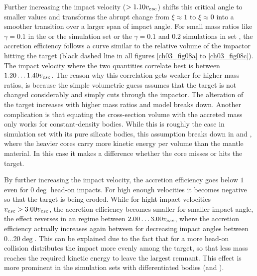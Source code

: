 Further increasing the impact velocity ($> 1.10 v_{esc}$) shifts this critical angle to smaller values and transforms the abrupt change from $\xi \approx 1$ to $\xi \approx 0$ into a smoother transition over a larger span of impact angle. For small mass ratios like $\gamma = 0.1$ in the \css or the simulation set or the $\gamma = 0.1$ and $0.2$ simulations in set \rss, the accretion efficiency follows a curve similar to the relative volume of the impactor hitting the target (black dashed line in all figures \ref{ch03_fig08a} to \ref{ch03_fig08c}). The impact velocity where the two quantities correlate best is between $1.20 \dots 1.40 v_{esc}$. The reason why this correlation gets weaker for higher mass ratios, is because the simple volumetric guess assumes that the target is not changed considerably and simply cuts through the impactor. The alteration of the target increases with higher mass ratios and model breaks down. Another complication is that equating the cross-section volume with the accreted mass only works for constant-density bodies. While this is roughly the case in simulation set \rss with its pure silicate bodies, this assumption breaks down in \css and \iss, where the heavier cores carry more kinetic energy per volume than the mantle material. In this case it makes a difference whether the core misses or hits the target. 

By further increasing the impact velocity, the accretion efficiency goes below $1$ even for $0 \deg$ head-on impacts. For high enough velocities it becomes negative so that the target is being eroded. While for hight impact velocities $v_{esc} > 3.00 v_{esc}$, the accretion efficiency becomes smaller for smaller impact angle, the effect reverses in an regime between $2.00 \dots 3.00 v_{esc}$, where the accretion efficiency actually increases again between for decreasing impact angles between $0 \dots 20 \deg$. This can be explained due to the fact that for a more head-on collision distributes the impact more evenly among the target, so that less mass reaches the required kinetic energy to leave the largest remnant. This effect is more prominent in the simulation sets with differentiated bodies (\css and \iss).

